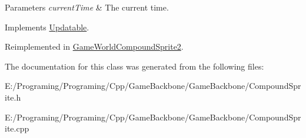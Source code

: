 \begin{DoxyParams}{Parameters}
{\em current\+Time} & The current time.\\
\hline
\end{DoxyParams}


Implements \hyperlink{class_updatable}{Updatable}.



Reimplemented in \hyperlink{class_game_world_compound_sprite2_a068bdce311f91566550409016df88489}{Game\+World\+Compound\+Sprite2}.



The documentation for this class was generated from the following files\+:\begin{DoxyCompactItemize}
\item 
E\+:/\+Programing/\+Programing/\+Cpp/\+Game\+Backbone/\+Game\+Backbone/Compound\+Sprite.\+h\item 
E\+:/\+Programing/\+Programing/\+Cpp/\+Game\+Backbone/\+Game\+Backbone/Compound\+Sprite.\+cpp\end{DoxyCompactItemize}
